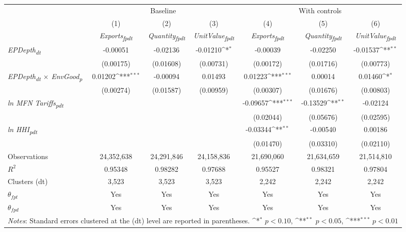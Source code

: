 {
\def\sym#1{\ifmmode^{#1}\else\(^{#1}\)\fi}
\begin{tabular}{l*{6}{c}}
\toprule
&\multicolumn{3}{c}{Baseline}&\multicolumn{3}{c}{With controls}\\\cmidrule(lr){2-4}\cmidrule(lr){5-7}
&(1)&(2)&(3)&(4)&(5)&(6)\\
&\textit{Exports\textsubscript{fpdt}}&\textit{Quantity\textsubscript{fpdt}}&\textit{UnitValue\textsubscript{fpdt}}&\textit{Exports\textsubscript{fpdt}}&\textit{Quantity\textsubscript{fpdt}}&\textit{UnitValue\textsubscript{fpdt}}\\
\midrule
\textit{EPDepth\textsubscript{dt}} & -0.00051 & -0.02136 & -0.01210\sym{*} & -0.00039 & -0.02250 & -0.01537\sym{**}\\
 & (0.00175) & (0.01608) & (0.00731) & (0.00172) & (0.01716) & (0.00773)\\
\addlinespace
\textit{EPDepth\textsubscript{dt} $\times$ EnvGood\textsubscript{p}} & 0.01202\sym{***} & -0.00094 & 0.01493 & 0.01223\sym{***} & 0.00014 & 0.01460\sym{*}\\
 & (0.00274) & (0.01587) & (0.00959) & (0.00307) & (0.01676) & (0.00803)\\
\addlinespace
\textit{ln MFN Tariffs\textsubscript{pdt}} &  &  &  & -0.09657\sym{***} & -0.13529\sym{**} & -0.02124\\
 &  &  &  & (0.02044) & (0.05676) & (0.02595)\\
\addlinespace
\textit{ln HHI\textsubscript{pdt}} &  &  &  & -0.03344\sym{**} & -0.00540 & 0.00186\\
 &  &  &  & (0.01470) & (0.03310) & (0.02110)\\
\midrule
Observations & 24,352,638 & 24,291,846 & 24,158,836 & 21,690,060 & 21,634,659 & 21,514,810\\
$R^{2}$ & 0.95348 & 0.98282 & 0.97688 & 0.95527 & 0.98321 & 0.97804\\
Clusters (dt) & 3,523 & 3,523 & 3,523 & 2,242 & 2,242 & 2,242\\
$\theta_{fpt}$ & Yes & Yes & Yes & Yes & Yes & Yes\\
$\theta_{fpd}$ & Yes & Yes & Yes & Yes & Yes & Yes\\
\bottomrule
\multicolumn{7}{l}{\footnotesize \textit{Notes}: Standard errors clustered at the (dt) level are reported in parentheses. \sym{*} \(p<0.10\), \sym{**} \(p<0.05\), \sym{***} \(p<0.01\)}\\
\end{tabular}
}
